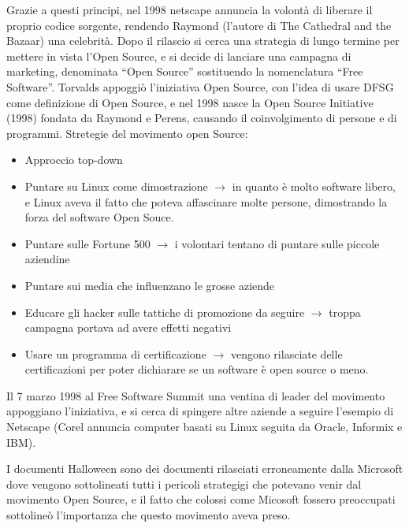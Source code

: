 Grazie a questi principi, nel 1998 netscape annuncia la volont\`a di liberare il proprio codice sorgente, rendendo Raymond (l'autore di The Cathedral and the Bazaar) una celebrit\`a. Dopo il rilascio si cerca una strategia di lungo termine per mettere in vista l'Open Source, e si decide di lanciare una campagna di marketing, denominata ``Open Source'' sostituendo la nomenclatura ``Free Software''. Torvalds appoggi\`o l'iniziativa Open Source, con l'idea di usare DFSG come definizione di Open Source, e nel 1998 nasce la Open Source Initiative (1998) fondata da Raymond e Perens, causando il coinvolgimento di persone e di programmi. Stretegie del movimento open Source:
\begin{itemize}

\item Approccio top-down
\item Puntare su Linux come dimostrazione $\to$ in quanto \`e molto software libero, e Linux aveva il fatto che poteva affascinare molte persone, dimostrando la forza del software Open Souce.
\item Puntare sulle Fortune 500 $\to$ i volontari tentano di puntare sulle piccole aziendine
\item Puntare sui media che influenzano le grosse aziende
\item Educare gli hacker sulle tattiche di promozione da seguire $\to$ troppa campagna portava ad avere effetti negativi
\item Usare un programma di certificazione $\to$ vengono rilasciate delle certificazioni per poter dichiarare se un software \`e open source o meno.

\end{itemize}

Il 7 marzo 1998 al Free Software Summit una ventina di leader del movimento appoggiano l'iniziativa, e si cerca di spingere altre aziende a seguire l'esempio di Netscape (Corel annuncia computer basati su Linux seguita da Oracle, Informix e IBM).

I documenti Halloween sono dei documenti rilasciati erroneamente dalla Microsoft dove vengono sottolineati tutti i pericoli strategigi che potevano venir dal movimento Open Source, e il fatto che colossi come Micosoft fossero preoccupati sottoline\`o l'importanza che questo movimento aveva preso.

